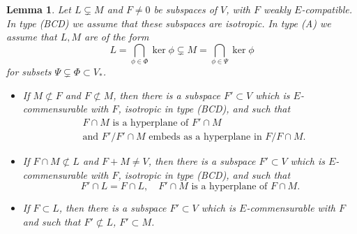 \documentclass[12pt]{amsart}
\numberwithin{equation}{section}
\newtheorem{lemma}[theorem]{Lemma}
\theoremstyle{definition}
\begin{document}
\begin{lemma}
\label{lemma-2-T1}
Let $L\subsetneq M$ and $F\not=0$ be subspaces of $V$, 
with $F$ weakly $E$-compatible. In type (BCD) we assume that these subspaces are isotropic.
In type (A) we assume that $L,M$ are of the form
\[
L=\bigcap_{\phi\in\Phi}\ker\phi\subsetneq M=\bigcap_{\phi\in\Psi}\ker\phi
\]
for subsets $\Psi\subsetneq \Phi\subset V_*$.
\begin{itemize}
\item[\rm (a)] If $M\not\subset F$ and $F\not\subset M$, then there is a subspace $F'\subset V$ which is $E$-commensurable with $F$, isotropic in type (BCD), and such that
\begin{eqnarray*}
 & \mbox{$F\cap M$ is a hyperplane of $F'\cap M$} \\
 & \mbox{and $F'/F'\cap M$ embeds as a hyperplane in $F/F\cap M$.}
\end{eqnarray*}
\item[\rm (b)] If $F\cap M\not\subset L$ and $F+M\not=V$, then there is a subspace $F'\subset V$ which is
$E$-commensurable with $F$, isotropic in type (BCD), and such that
\[
F'\cap L=F\cap L,\quad  \mbox{$F'\cap M$ is a hyperplane of $F\cap M$.}
\]
\item[\rm (c)] If $F\subset L$, then there is a subspace $F'\subset V$ which is
$E$-commensurable with $F$%
and such that
$F'\not\subset L$, $F'\subset M$.
\end{itemize}
\end{lemma}
\end{document}
